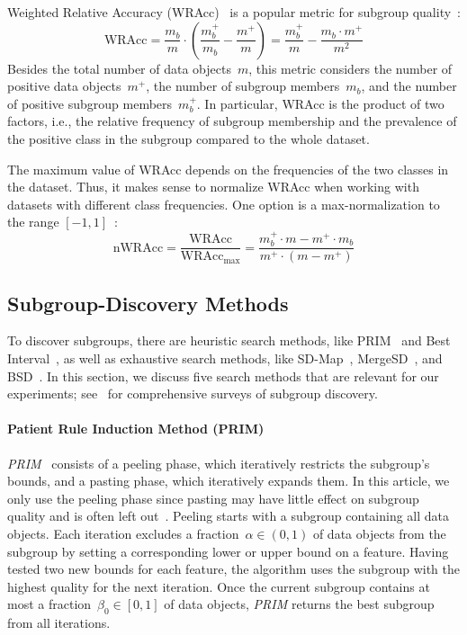 \documentclass[acmsmall]{acmart} %
\theoremstyle{acmplain}
\theoremstyle{acmdefinition}
\begin{document}
Weighted Relative Accuracy (WRAcc)~\cite{lavravc1999rule} is a popular metric for subgroup quality~\cite{meeng2021real}:
%
\begin{equation}
	\text{WRAcc} = \frac{m_b}{m} \cdot \left( \frac{m_b^+}{m_b} - \frac{m^+}{m} \right) = \frac{m_b^+}{m} - \frac{m_b \cdot m^+}{m^2}
	\label{eq:csd:wracc}
\end{equation}
%
Besides the total number of data objects~$m$, this metric considers the number of positive data objects~$m^+$, the number of subgroup members~$m_b$, and the number of positive subgroup members~$m_b^+$.
In particular, WRAcc is the product of two factors, i.e., the relative frequency of subgroup membership and the prevalence of the positive class in the subgroup compared to the whole dataset.

The maximum value of WRAcc depends on the frequencies of the two classes in the dataset.
Thus, it makes sense to normalize WRAcc when working with datasets with different class frequencies.
One option is a max-normalization to the range $[-1, 1]$~\cite{mathonat2021anytime}:
%
\begin{equation}
	\text{nWRAcc} = \frac{\text{WRAcc}}{\text{WRAcc}_{\text{max}}} = \frac{m_b^+ \cdot m - m^+ \cdot m_b}{m^+ \cdot (m - m^+)}
	\label{eq:csd:wracc-normalized}
\end{equation}

\subsection{Subgroup-Discovery Methods}
\label{sec:csd:fundamentals:search}

To discover subgroups, there are heuristic search methods, like PRIM~\cite{friedman1999bump} and Best Interval~\cite{mampaey2012efficient}, as well as exhaustive search methods, like SD-Map~\cite{atzmueller2009fast, atzmueller2006sd}, MergeSD~\cite{grosskreutz2009subgroup}, and BSD~\cite{lemmerich2016fast, lemmerich2010fast}.
In this section, we discuss five search methods that are relevant for our experiments; see~\cite{atzmueller2015subgroup, helal2016subgroup, herrera2011overview, ventura2018subgroup} for comprehensive surveys of subgroup discovery.

\paragraph{Patient Rule Induction Method (PRIM)}

\emph{PRIM}~\cite{friedman1999bump} consists of a peeling phase, which iteratively restricts the subgroup's bounds, and a pasting phase, which iteratively expands them.
In this article, we only use the peeling phase since pasting may have little effect on subgroup quality and is often left out~\cite{arzamasov2021reds}.
Peeling starts with a subgroup containing all data objects.
Each iteration excludes a fraction~$\alpha \in (0, 1)$ of data objects from the subgroup by setting a corresponding lower or upper bound on a feature.
Having tested two new bounds for each feature, the algorithm uses the subgroup with the highest quality for the next iteration.
Once the current subgroup contains at most a fraction~$\beta_0 \in [0, 1]$ of data objects, \emph{PRIM} returns the best subgroup from all iterations.
\end{document}

